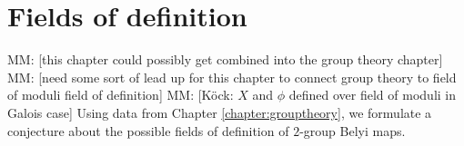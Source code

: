 \documentclass{dcthesis}
\newcommand{\PP}{\mathbb P}
\newcommand{\QQ}{\mathbb Q}
\newcommand{\defi}[1]{\textsf{#1}}
\newcommand{\mm}[1]{{\color{blue} \sf MM: [#1]}}
\numberwithin{equation}{section}
\newtheorem{theorem}[equation]{Theorem}
\theoremstyle{definition}
\newtheorem{definition}[equation]{Definition}
\theoremstyle{remark}
\begin{document}
\chapter{Fields of definition}{\label{chapter:fieldsofdefinition}
  \mm{this chapter could possibly get combined into the group theory chapter}
  \mm{need some sort of lead up for this chapter to connect group theory to field of moduli field of definition}
  \mm{K\"{o}ck: $X$ and $\phi$ defined over field of moduli in Galois case}
  Using data from Chapter \ref{chapter:grouptheory},
  we formulate a conjecture about the possible fields of definition of
  $2$-group Belyi maps.
}
\end{document}
